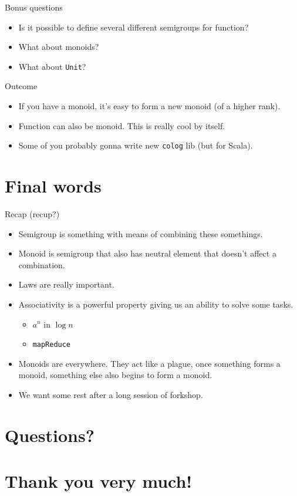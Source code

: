 \documentclass[presentation,aspectratio=169,smaller]{beamer}
\begin{document}
\begin{frame}[label={sec:org79a88dc},fragile]{Bonus questions}
 \begin{itemize}
\item <1-> Is it possible to define several different semigroups for function?
\item <2-> What about monoids?
\item <3-> What about \texttt{Unit}?
\end{itemize}
\end{frame}

\begin{frame}[label={sec:org318e709},fragile]{Outcome}
 \begin{itemize}
\item <1-> If you have a monoid, it's easy to form a new monoid (of a higher rank).
\item <2-> Function can also be monoid. This is really cool by itself.
\item <3-> Some of you probably gonna write new \texttt{colog} lib (but for Scala).
\end{itemize}
\end{frame}

\section*{Final words}
\label{sec:orgf673f35}
\begin{frame}[label={sec:org47e2ade},fragile]{Recap (recup?)}
 \begin{itemize}
\item <1-> Semigroup is something with means of combining these somethings.
\item <2-> Monoid is semigroup that also has neutral element that doesn't affect a combination.
\item <3-> Laws are really important.
\item <4-> Associativity is a powerful property giving us an ability to solve some tasks.
\begin{itemize}
\item \(a^n\) in \(\log n\)
\item \texttt{mapReduce}
\end{itemize}
\item <5-> Monoids are everywhere. They act like a plague, once something forms a monoid,
something else also begins to form a monoid.
\item <6-> We want some rest after a long session of forkshop.
\end{itemize}
\end{frame}

\section{Questions?}
\label{sec:org6c4b1b9}

\section{Thank you very much!}
\label{sec:org4d33855}
\end{document}
